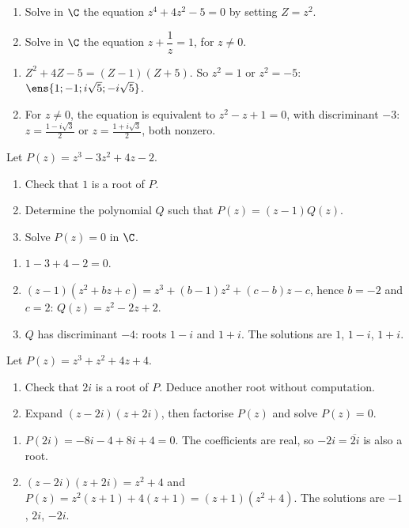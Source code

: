 \begin{exercise}
\begin{enumerate}
\item Solve in $\C$ the equation $z^4+4z^2-5=0$ by setting $Z=z^2$.
\item Solve in $\C$ the equation $z+\dfrac1z=1$, for $z\neq0$.
\end{enumerate}
\end{exercise}
\begin{solution}
\begin{enumerate}
\item $Z^2+4Z-5=(Z-1)(Z+5)$. So $z^2=1$ or $z^2=-5$: $\ens{1;-1;i\sqrt5;-i\sqrt5}$.
\item For $z\neq0$, the equation is equivalent to $z^2-z+1=0$, with discriminant $-3$: $z=\frac{1-i\sqrt3}2$ or $z=\frac{1+i\sqrt3}2$, both nonzero.
\end{enumerate}
\end{solution}

\begin{exercise}
Let $P(z)=z^3-3z^2+4z-2$.
\begin{enumerate}
\item Check that $1$ is a root of $P$.
\item Determine the polynomial $Q$ such that $P(z)=(z-1)Q(z)$.
\item Solve $P(z)=0$ in $\C$.
\end{enumerate}
\end{exercise}
\begin{solution}
\begin{enumerate}
\item $1-3+4-2=0$.
\item $(z-1)\left(z^2+bz+c\right)=z^3+(b-1)z^2+(c-b)z-c$, hence $b=-2$ and $c=2$: $Q(z)=z^2-2z+2$.
\item $Q$ has discriminant $-4$: roots $1-i$ and $1+i$. The solutions are $1$, $1-i$, $1+i$.
\end{enumerate}
\end{solution}

\begin{exercise}
Let $P(z)=z^3+z^2+4z+4$.
\begin{enumerate}
\item Check that $2i$ is a root of $P$. Deduce another root without computation.
\item Expand $(z-2i)(z+2i)$, then factorise $P(z)$ and solve $P(z)=0$.
\end{enumerate}
\end{exercise}
\begin{solution}
\begin{enumerate}
\item $P(2i)=-8i-4+8i+4=0$. The coefficients are real, so $-2i=\overline{2i}$ is also a root.
\item $(z-2i)(z+2i)=z^2+4$ and $P(z)=z^2(z+1)+4(z+1)=(z+1)\left(z^2+4\right)$. The solutions are $-1$, $2i$, $-2i$.
\end{enumerate}
\end{solution}

